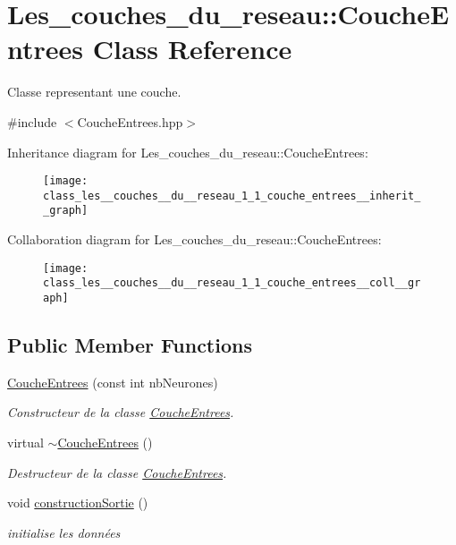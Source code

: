 \hypertarget{class_les__couches__du__reseau_1_1_couche_entrees}{}\section{Les\+\_\+couches\+\_\+du\+\_\+reseau\+:\+:Couche\+Entrees Class Reference}
\label{class_les__couches__du__reseau_1_1_couche_entrees}


Classe representant une couche.  




{\ttfamily \#include $<$Couche\+Entrees.\+hpp$>$}



Inheritance diagram for Les\+\_\+couches\+\_\+du\+\_\+reseau\+:\+:Couche\+Entrees\+:\nopagebreak
\begin{figure}[H]
\begin{center}
\leavevmode
\texttt{[image: class\_les\_\_couches\_\_du\_\_reseau\_1\_1\_couche\_entrees\_\_inherit\_\_graph]}
\end{center}
\end{figure}


Collaboration diagram for Les\+\_\+couches\+\_\+du\+\_\+reseau\+:\+:Couche\+Entrees\+:\nopagebreak
\begin{figure}[H]
\begin{center}
\leavevmode
\texttt{[image: class\_les\_\_couches\_\_du\_\_reseau\_1\_1\_couche\_entrees\_\_coll\_\_graph]}
\end{center}
\end{figure}
\subsection*{Public Member Functions}
\begin{DoxyCompactItemize}
\item 
\hyperlink{class_les__couches__du__reseau_1_1_couche_entrees_a880aff72f6d9dfa97a8f38aed085e28b}{Couche\+Entrees} (const int nb\+Neurones)
\begin{DoxyCompactList}\small\item\em Constructeur de la classe \hyperlink{class_les__couches__du__reseau_1_1_couche_entrees}{Couche\+Entrees}. \end{DoxyCompactList}\item 
virtual \hyperlink{class_les__couches__du__reseau_1_1_couche_entrees_ac672754ca6746650c139d3b22d5c611c}{$\sim$\+Couche\+Entrees} ()
\begin{DoxyCompactList}\small\item\em Destructeur de la classe \hyperlink{class_les__couches__du__reseau_1_1_couche_entrees}{Couche\+Entrees}. \end{DoxyCompactList}\item 
void \hyperlink{class_les__couches__du__reseau_1_1_couche_entrees_a52ed50cfc77b6aa116e1966faa349759}{construction\+Sortie} ()
\begin{DoxyCompactList}\small\item\em initialise les données \end{DoxyCompactList}\end{DoxyCompactItemize}


